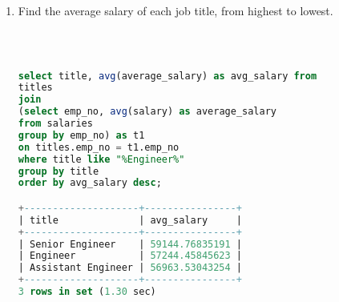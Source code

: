 \documentclass[12pt]{article}
\begin{document}
\begin{enumerate}
\begin{lstlisting}[language=SQL]
\end{lstlisting}


\item Find the average salary of each job title, from highest to lowest.

\begin{lstlisting}[language=SQL]



select title, avg(average_salary) as avg_salary from
titles
join
(select emp_no, avg(salary) as average_salary
from salaries 
group by emp_no) as t1
on titles.emp_no = t1.emp_no
where title like "%Engineer%"
group by title
order by avg_salary desc;

+--------------------+----------------+
| title              | avg_salary     |
+--------------------+----------------+
| Senior Engineer    | 59144.76835191 |
| Engineer           | 57244.45845623 |
| Assistant Engineer | 56963.53043254 |
+--------------------+----------------+
3 rows in set (1.30 sec)



\end{lstlisting}






\end{enumerate}



 
\end{document}
